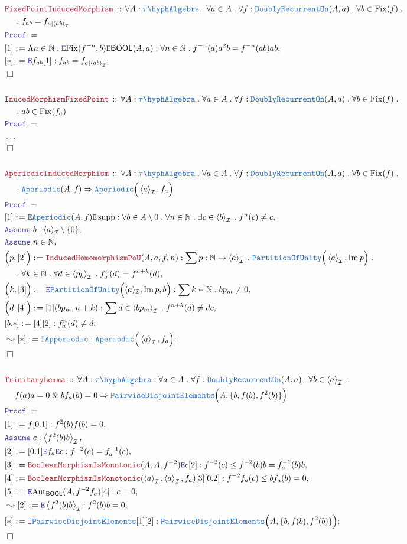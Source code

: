 \documentclass[12pt]{scrartcl}
\newcommand{\TYPE}[1]{\textcolor{NavyBlue}{\mathtt{#1}}}
\newcommand{\LOGIC}[1]{\textcolor{Blue}{\mathtt{#1}}}
\newcommand{\THM}[1]{\textcolor{Maroon}{\mathtt{#1}}}
\renewcommand{\.}{\; . \;}
\newcommand{\de}{: \kern 0.1pc =}
\newcommand{\Theorem}[2]{& \THM{#1} \, :: \, #2 \\ & \Proof = \\ }
\newcommand{\NewLine}{\\ & \kern 1pc}
\newcommand{\Page}[1]{ \begin{align*} #1 \end{align*}   }
\newcommand{\NoProof}{ & \ldots \\ \EndProof}
\renewcommand{\And}{\; \& \;}
\newcommand{\Imply}{\Rightarrow}
\newcommand{\Intro}{\LOGIC{I}}
\newcommand{\Elim}{\LOGIC{E}}
\newcommand{\Nat}{\mathbb{N} }
\DeclareMathOperator*{\im}{Im}
\DeclareMathOperator*{\supp}{supp}
\newcommand{\Aut}{\mathrm{Aut}}
\newcommand{\Say}[3]{& #1 \de #2 : #3, \\}
\newcommand{\Conclude}[3]{& #1 \de #2 : #3; \\}
\newcommand{\Derive}[3]{& \leadsto #1 \de #2 : #3, \\}
\newcommand{\DeriveConclude}[3]{& \leadsto #1 \de #2 : #3 ; \\}
\newcommand{\Assume}[2]{& \LOGIC{Assume} \; #1 : #2, \\}
\newcommand{\AssumeIn}[2]{& \LOGIC{Assume} \; #1 \in #2, \\}
\newcommand{\QED}{\; \square}
\newcommand{\EndProof}{& \QED \\}
\newcommand{\Proof}{\LOGIC{Proof} \; }
\newcommand{\genIdeal}[1]{\left\langle #1 \right\rangle_\mathcal{I}}
\newcommand{\I}{\mathcal{I}}
\newcommand{\PD}{\TYPE{PairwiseDisjointElements}}
\newcommand{\PoU}{\TYPE{PartitionOfUnity}}
\newcommand{\Fix}{\mathrm{Fix}}
\newcommand{\TAlgebra}{\TYPE{\tau\hyph Algebra}}
\newcommand{\BOOL}{\mathsf{BOOL}}
\begin{document}
\Page{
	\Theorem{FixedPointInducedMorphism}
	{
		\forall A : \TAlgebra \.
		\forall a \in A \. 
		\forall f : \TYPE{DoublyRecurrentOn}(A,a) \.
		\forall b \in \Fix(f) \. \NewLine \.
		f_{ab} = f_{a|\genIdeal{ab}}
	}
	\Say{[1]}{\Lambda n \in \Nat \. \Elim \Fix(f^{-n},b) \Elim \BOOL(A,a)}
	{
		\forall  n \in \Nat  \. f^{-n}(a) a^2 b = f^{-n}(ab) ab
	}
	\Conclude{[*]}
	{
		\Elim f_{ab} [1]
	}
	{
		f_{ab} = f_{a|\genIdeal{ab}}
	}
	\EndProof
	\\
	\Theorem{InucedMorphismFixedPoint}
	{
		\forall A : \TAlgebra \.
		\forall a \in A \. 
		\forall f : \TYPE{DoublyRecurrentOn}(A,a) \.
		\forall b \in \Fix(f) \. \NewLine \.
		ab \in \Fix(f_a)
	}
	\NoProof
	\\
	\Theorem{AperiodicInducedMorphism}
	{
		\forall A : \TAlgebra \.
		\forall a \in A \. 
		\forall f : \TYPE{DoublyRecurrentOn}(A,a) \.
		\forall b \in \Fix(f) \. \NewLine \.
		\TYPE{Aperiodic}(A,f) \Imply \TYPE{Aperiodic}\Big(\genIdeal{a},f_a\Big)
	}
	\Say{[1]}{\Elim \TYPE{Aperiodic}(A,f) \Elim \supp }
	{
		\forall b \in A \setminus{0} \. \forall n \in \Nat \. \exists c \in \genIdeal{b} \.
		f^n(c) \neq c
	}
	\Assume{b}{\genIdeal{a} \setminus \{0\}}
	\AssumeIn{n}{\Nat}
	\Say{\Big(p,[2]\Big)}
	{
		\THM{InducedHomomorphismPoU}(A,a,f,n)
	}
	{
		\sum p : \Nat \to \genIdeal{a} \.
		\PoU\Big(\genIdeal{a},\im p \Big) \. \NewLine \.
		\forall k \in \Nat \. \forall d \in \genIdeal{p_k} \.
		 f^n_a(d) = f^{n + k}(d)}	
	\Say{\Big(k,[3]\Big)}{\Elim \PoU\Big(\langle a \rangle_\I,\im p,b\Big) }
	{
		\sum k \in \Nat \.  bp_m \neq 0
	}
	\Say{\Big(d,[4] \Big)}
	{
		[1](bp_m, n + k )
	}
	{
		\sum d \in \genIdeal{bp_m} \. 
		f^{n+k}(d) \neq dc
	}
	\Conclude{[b.*]}{[4][2]}{f_a^n(d) \neq d}
	\DeriveConclude{[*]}{\Intro \TYPE{Apperiodic}}
	{\TYPE{Aperiodic}\Big(\genIdeal{a},f_a\Big)}
	\EndProof
	\\
	\Theorem{TrinitaryLemma}
	{
		\forall A : \TAlgebra \.
		\forall a \in A \. 
		\forall f : \TYPE{DoublyRecurrentOn}(A,a) \.
		\forall b \in \genIdeal{a} \.
		\NewLine 		
		f(a)a = 0 \And b f_a(b) = 0 
		\Imply  \PD\Big( A, \{ b, f(b), f^2(b) \} \Big)  
	}
	\Say{[1]}{f[0.1]}{f^2(b)f(b) = 0}
	\Assume{c}{\genIdeal{ f^2(b) b }}
	\Say{[2]}{[0.1]\Elim f_a \Elim c}{ f^{-2}(c) = f_a^{-1}(c)}
	\Say{[3]}{\THM{BooleanMorphismIsMonotonic}(A,A,f^{-2})\Elim c [2]}
	{
						f^{-2}(c) \le f^{-2}(b) b = f_a^{-1}(b) b
	}
	\Say{[4]}{\THM{BooleanMorphismIsMonotonic}(\genIdeal{a},\genIdeal{a},f_a)[3][0.2]}
	{
						f^{-2}f_a(c) \le  b f_a(b) = 0
	}
	\Conclude{[5]}{\Elim \Aut_\BOOL(A,f^{-2}f_a)[4]}{c = 0 }
	\Derive{[2]}{\Elim \genIdeal{ f^2(b) b } }{  f^2(b) b = 0}
	\Conclude{[*]}{\Intro \PD [1][2]}{\PD\Big( A, \{ b, f(b), f^2(b) \} \Big)}
	\EndProof
}
\end{document}
